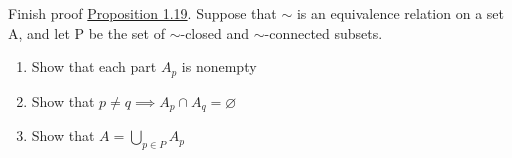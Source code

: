 
Finish proof \href{doc/1 math/Seven Sketches in Compositionality/1 Chapter 1: Generative Effects/2 What is order/Partitions are equivalences}{Proposition 1.19}. Suppose that $\sim$ is an equivalence relation on a set A, and let P be the set of $\sim$-closed and $\sim$-connected subsets.
\begin{enumerate}
  \item Show that each part $A_p$ is nonempty
  \item Show that $p \ne q \implies A_p \cap A_q = \varnothing$
  \item Show that $A = \bigcup_{p \in P} A_p$
\end{enumerate}